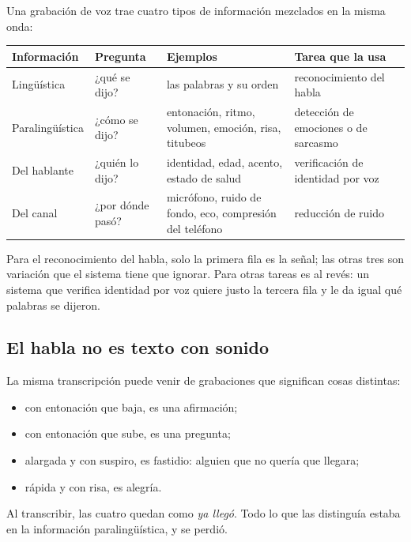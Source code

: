 \documentclass[11pt,letterpaper]{article}
\begin{document}
Una grabación de voz trae cuatro tipos de información mezclados en la
misma onda:

\begin{center}
\small
\begin{tabular}{l>{\raggedright\arraybackslash}p{3.0cm}%
                 >{\raggedright\arraybackslash}p{4.0cm}%
                 >{\raggedright\arraybackslash}p{4.0cm}}
    \toprule
    \textbf{Información} & \textbf{Pregunta} & \textbf{Ejemplos}
    & \textbf{Tarea que la usa} \\
    \midrule
    Lingüística & ¿qué se dijo?
                & las palabras y su orden
                & reconocimiento del habla \\
    \addlinespace
    Paralingüística & ¿cómo se dijo?
                    & entonación, ritmo, volumen, emoción, risa,
                      titubeos
                    & detección de emociones o de sarcasmo \\
    \addlinespace
    Del hablante & ¿quién lo dijo?
                 & identidad, edad, acento, estado de salud
                 & verificación de identidad por voz \\
    \addlinespace
    Del canal & ¿por dónde pasó?
              & micrófono, ruido de fondo, eco, compresión del
                teléfono
              & reducción de ruido \\
    \bottomrule
\end{tabular}
\end{center}

Para el reconocimiento del habla, solo la primera fila es la señal;
las otras tres son variación que el sistema tiene que ignorar. Para
otras tareas es al revés: un sistema que verifica identidad por voz
quiere justo la tercera fila y le da igual qué palabras se dijeron.

\subsection*{El habla no es texto con sonido}

\begin{ejemplo}
    La misma transcripción puede venir de grabaciones que significan
    cosas distintas:
    \begin{itemize}[itemsep=0.2em]
        \item con entonación que baja, es una afirmación;
        \item con entonación que sube, es una pregunta;
        \item alargada y con suspiro, es fastidio: alguien que no
              quería que llegara;
        \item rápida y con risa, es alegría.
    \end{itemize}
    Al transcribir, las cuatro quedan como \textit{ya llegó}. Todo lo
    que las distinguía estaba en la información paralingüística, y se
    perdió.
\end{ejemplo}
\end{document}
